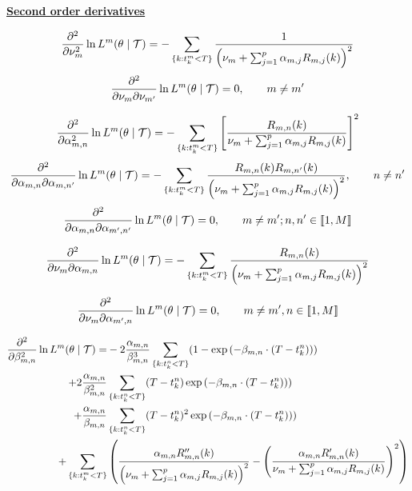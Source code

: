 \documentclass[11pt]{book}
\newcommand{\lsum}[1]{\sum_{ \{k : t_k^#1 < T \} }}
\newcommand{\lexp}[1]{
\exp \left ( - \beta_{m,n} \cdot ( T - t_k^#1 ) \right ) 
}
\newcommand{\denomR}{\nu_m + \sum_{j=1}^p \alpha_{m,j} R_{m,j} (k) }
\begin{document}
\vspace{0.6 cm}
\underline{\textbf{Second order derivatives}}

\begin{equation}
\frac{\partial^2  } {\partial \nu_m^2} \ln L^m ( \theta \mid \Tau ) = -  \lsum{m} \frac 1 { \left (\denomR \right )^2}
\end{equation}
\begin{equation}
\frac{\partial^2 } {\partial \nu_m \partial \nu_{m'}} \ln L^m ( \theta \mid \mathcal{T} ) = 0, \qquad m \neq m'
\end{equation}


\begin{equation}
\frac{\partial^2  } {\partial \alpha_{m,n}^2} \ln L^m ( \theta \mid \Tau ) = - \lsum{m} \left [ \frac{R_{m,n}(k)}{\denomR} \right ] ^2
\end{equation}
\begin{equation}
\frac{\partial^2 } {\partial \alpha_{m,n} \partial \alpha_{m,n'} } \ln L^m ( \theta \mid \Tau ) =  - \lsum{m}  \frac{R_{m,n}(k) R_{m,n'}(k) }
{\left ( \denomR  \right ) ^2}, \qquad n \neq n'
\end{equation}
\begin{equation}
\frac{\partial^2 } {\partial \alpha_{m,n} \partial \alpha_{m',n'} } \ln L^m ( \theta \mid \mathcal{T} ) = 0 , \qquad m \neq m'; n,n' \in  \llbracket 1, M \rrbracket
\end{equation}

\begin{equation}
\frac{\partial^2 } {\partial \nu_m \partial \alpha_{m,n} } \ln L^m ( \theta \mid \Tau ) =  - \lsum{m}  \frac{R_{m,n}(k) }{  \left ( \denomR \right )^2} 
\end{equation}

\begin{equation}
\frac{\partial^2  } {\partial \nu_m \partial \alpha_{m',n} } \ln L^m ( \theta \mid \mathcal{T} ) = 0 , \qquad m \neq m', n \in  \llbracket 1, M \rrbracket
\end{equation}



\begin{align}
\frac{\partial^2 } {\partial \beta_{m,n}^2} \ln L^m ( \theta \mid \Tau ) = & - 2 \frac {\alpha_{m,n}} {\beta_{m,n}^3} \lsum{n} ( 1 - \lexp{n} ) \notag \\ 
+  2 \frac{ \alpha_{m,n} } { \beta_{m,n}^2 } & \lsum{n} ( T-t_k^n) \lexp{n} )  \notag \\
+ \frac{ \alpha_{m,n} } { \beta_{m,n} } & \lsum{n} ( T-t_k^n)^2 \lexp{n} )  \notag \\ 
+ \lsum{m} & \left (  \frac{\alpha_{m,n} R''_{m,n} (k) }{ \left ( \denomR \right )^2} - \left ( \frac{\alpha_{m,n} R'_{m,n} (k) }{ \denomR} \right )^2 \right ) 
\end{align}
\end{document}
